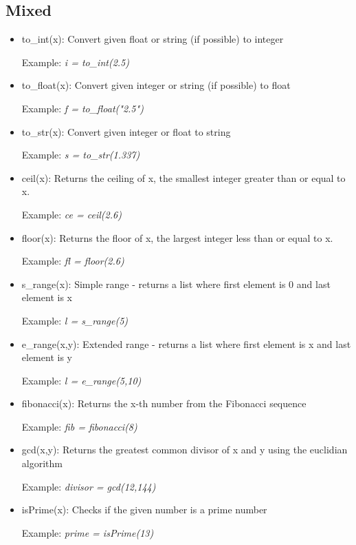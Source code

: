 \documentclass{article}
\begin{document}
\subsection{Mixed}
\begin{itemize}
\item to\_int(x): Convert given float or string (if possible) to integer

Example: \textit{i = to\_int(2.5)}

\item to\_float(x): Convert given integer or string (if possible) to float

Example: \textit{f = to\_float("2.5")}

\item to\_str(x): Convert given integer or float to string

Example: \textit{s = to\_str(1.337)}

\item ceil(x): Returns the ceiling of x, the smallest integer greater than or equal to x.

Example: \textit{ce = ceil(2.6)}

\item floor(x): Returns the floor of x, the largest integer less than or equal to x.

Example: \textit{fl = floor(2.6)}

\item s\_range(x): Simple range - returns a list where first element is 0 and last element is x

Example: \textit{l = s\_range(5)}

\item e\_range(x,y): Extended range - returns a list where first element is x and last element is y

Example: \textit{l = e\_range(5,10)}

\item fibonacci(x): Returns the x-th number from the Fibonacci sequence

Example: \textit{fib = fibonacci(8)}

\item gcd(x,y): Returns the greatest common divisor of x and y using the euclidian algorithm

Example: \textit{divisor = gcd(12,144)}

\item isPrime(x): Checks if the given number is a prime number

Example: \textit{prime = isPrime(13)}


\end{itemize}
\end{document}
